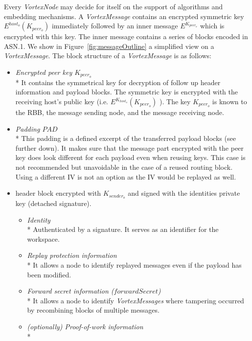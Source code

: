 \documentclass[acmsmall, screen, review]{acmart}
\begin{document}
	
	Every \emph{VortexNode} may decide for itself on the support of algorithms and embedding mechanisms. A \emph{VortexMessage} contains an encrypted symmetric key $E^{host_o}\left(K_{peer_o}\right)$ immediately followed by an inner message $E^{K_{peer_o}}$ which is encrypted with this key. The inner message contains a series of blocks encoded in ASN.1. We show in Figure~\ref{fig:messageOutline} a simplified view on a \emph{VortexMessage}. The block structure of a \emph{VortexMessage} is as follows:
	\begin{itemize}
		\item \emph{Encrypted peer key $K_{peer_o}$}\\*
		It contains the symmetrical key for decryption of follow up header information and payload blocks. The symmetric key is encrypted with the receiving host's public key (i.e. $E^{K_{host_o}}\left(K_{peer_o}\right)$ ). The key $K_{peer_o}$ is known to the RBB, the message sending node, and the message receiving node.
		\item \emph{Padding $PAD$}\\*
		This padding is a defined excerpt of the transferred payload blocks (see further down). It makes sure that the message part encrypted with the peer key does look different for each payload even when reusing keys. This case is not recommended but unavoidable in the case of a reused routing block. Using a different IV is not an option as the IV would be replayed as well.
		\item header block encrypted with $K_{sender_o}$ and signed with the identities private key (detached signature).
		\begin{itemize}
			\item \emph{Identity}\\*
			Authenticated by a signature. It serves as an identifier for the workspace.
			\item \emph{Replay protection information}\\*
			It allows a node to identify replayed messages even if the payload has been modified.
			\item \emph{Forward secret information ($forwardSecret$)}\\*
			It allows a node to identify \emph{VortexMessages} where tampering occurred by recombining blocks of multiple messages.      
			\item \emph{(optionally) Proof-of-work information}\\*

\end{itemize}
\end{itemize}
\end{document}
